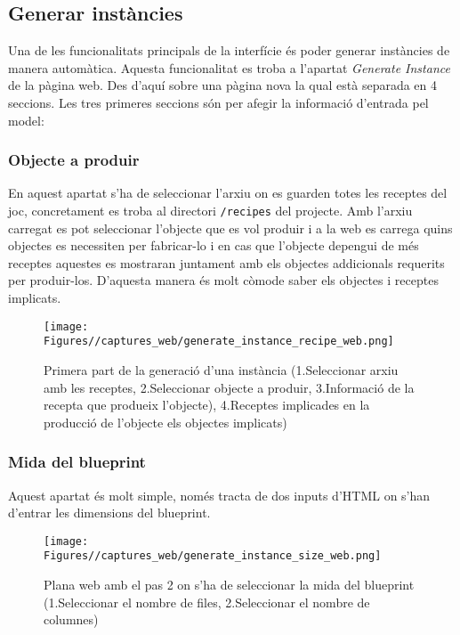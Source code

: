 \subsection{Generar instàncies}\label{subsec:generar-instancies}
Una de les funcionalitats principals de la interfície és poder generar instàncies de manera automàtica. Aquesta funcionalitat es troba a l'apartat \textit{Generate Instance} de la pàgina web. Des d'aquí sobre una pàgina nova la qual està separada en 4 seccions. Les tres primeres seccions són per afegir la informació d'entrada pel model:

\subsubsection{Objecte a produir}
En aquest apartat s'ha de seleccionar l'arxiu on es guarden totes les receptes del joc, concretament es troba al directori \lstinline{/recipes} del projecte. Amb l'arxiu carregat es pot seleccionar l'objecte que es vol produir i a la web es carrega quins objectes es necessiten per fabricar-lo i en cas que l'objecte depengui de més receptes aquestes es mostraran juntament amb els objectes addicionals requerits per produir-los. D'aquesta manera és molt còmode saber els objectes i receptes implicats.
\begin{figure}[H]
    \centering
    \texttt{[image: Figures//captures\_web/generate\_instance\_recipe\_web.png]}
    \caption{Primera part de la generació d'una instància (1.Seleccionar arxiu amb les receptes, 2.Seleccionar objecte a produir, 3.Informació de la recepta que produeix l'objecte), 4.Receptes implicades en la producció de l'objecte els objectes implicats)}
    \label{fig:generate_instance_recipe}
\end{figure}

\subsubsection{Mida del blueprint}
Aquest apartat és molt simple, només tracta de dos inputs d'HTML on s'han d'entrar les dimensions del blueprint.
\begin{figure}[H]
    \centering
    \texttt{[image: Figures//captures\_web/generate\_instance\_size\_web.png]}
    \caption{Plana web amb el pas 2 on s'ha de seleccionar la mida del blueprint (1.Seleccionar el nombre de files, 2.Seleccionar el nombre de columnes)}
    \label{fig:generate_instance_size}
\end{figure}

